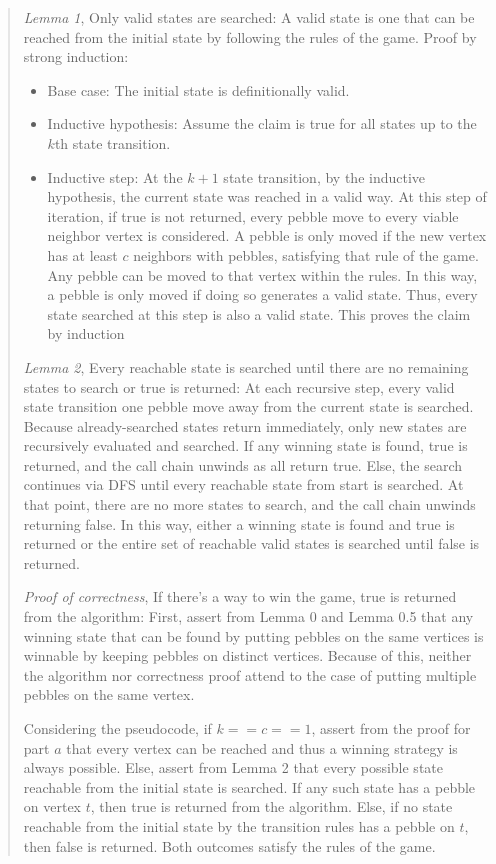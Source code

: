 \documentclass[11pt]{article}
\begin{document}
\begin{enumerate}
\begin{enumerate}
\begin{quote}
    \medskip
    \textit{Lemma 1}, Only valid states are searched: A valid state is one that can be reached from the initial state by following the rules of the game. Proof by strong induction: 
    \begin{itemize}
      \item Base case: The initial state is definitionally valid.  
      \item Inductive hypothesis: Assume the claim is true for all states up to the $k$th state transition.
      \item Inductive step: At the $k + 1$ state transition, by the inductive hypothesis, the current state was reached in a valid way. At this step of iteration, if true is not returned, every pebble move to every viable neighbor vertex is considered. A pebble is only moved if the new vertex has at least $c$ neighbors with pebbles, satisfying that rule of the game. Any pebble can be moved to that vertex within the rules. In this way, a pebble is only moved if doing so generates a valid state. Thus, every state searched at this step is also a valid state. This proves the claim by induction
    \end{itemize}

    \medskip
    \textit{Lemma 2}, Every reachable state is searched until there are no remaining states to search or true is returned: At each recursive step, every valid state transition one pebble move away from the current state is searched. Because already-searched states return immediately, only new states are recursively evaluated and searched. If any winning state is found, true is returned, and the call chain unwinds as all return true. Else, the search continues via DFS until every reachable state from start is searched. At that point, there are no more states to search, and the call chain unwinds returning false. In this way, either a winning state is found and true is returned or the entire set of reachable valid states is searched until false is returned. 

    \medskip
    \textit{Proof of correctness}, If there's a way to win the game, true is returned from the algorithm: First, assert from Lemma 0 and Lemma 0.5 that any winning state that can be found by putting pebbles on the same vertices is winnable by keeping pebbles on distinct vertices. Because of this, neither the algorithm nor correctness proof attend to the case of putting multiple pebbles on the same vertex. 

    \medskip
    Considering the pseudocode, if $k == c == 1$, assert from the proof for part $a$ that every vertex can be reached and thus a winning strategy is always possible. Else, assert from Lemma 2 that every possible state reachable from the initial state is searched. If any such state has a pebble on vertex $t$, then true is returned from the algorithm. Else, if no state reachable from the initial state by the transition rules has a pebble on $t$, then false is returned. Both outcomes satisfy the rules of the game.


\end{quote}
\end{enumerate}
\end{enumerate}
\end{document}
